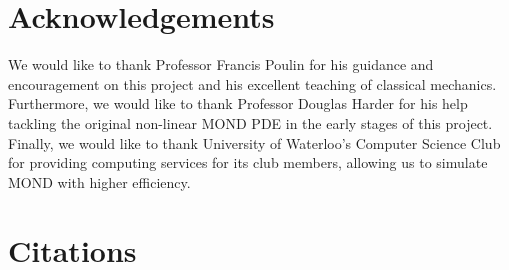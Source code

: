 \documentclass[11pt, twocolumn]{article}
\begin{document}
    \section*{Acknowledgements}
    We would like to thank Professor Francis Poulin for his guidance and encouragement on this project and his excellent teaching of classical mechanics. Furthermore, we would like to thank Professor Douglas Harder for his help tackling the original non-linear MOND PDE in the early stages of this project. Finally, we would like to thank University of Waterloo's Computer Science Club for providing computing services for its club members, allowing us to simulate MOND with higher efficiency.
    \section*{Citations}
    \printbibliography[heading=none]
\end{document}
